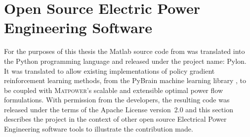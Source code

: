 \chapter{Open Source Electric Power Engineering Software}
\label{sec:oss}
For the purposes of this thesis the Matlab source code from \matpower was translated
into the Python programming language and released under the project name: Pylon.
 It was translated to allow existing implementations of policy gradient
reinforcement learning methods, from the PyBrain machine learning library
\cite{schaul:2010}, to be coupled with \textsc{Matpower}'s scalable and
extensible optimal power flow formulations. With permission from the \matpower
developers, the resulting code was released under the terms of the Apache
License version~2.0 \cite{lincoln:pyreto} and this section describes the project
in the context of other open source Electrical Power Engineering software tools
to illustrate the contribution made.

